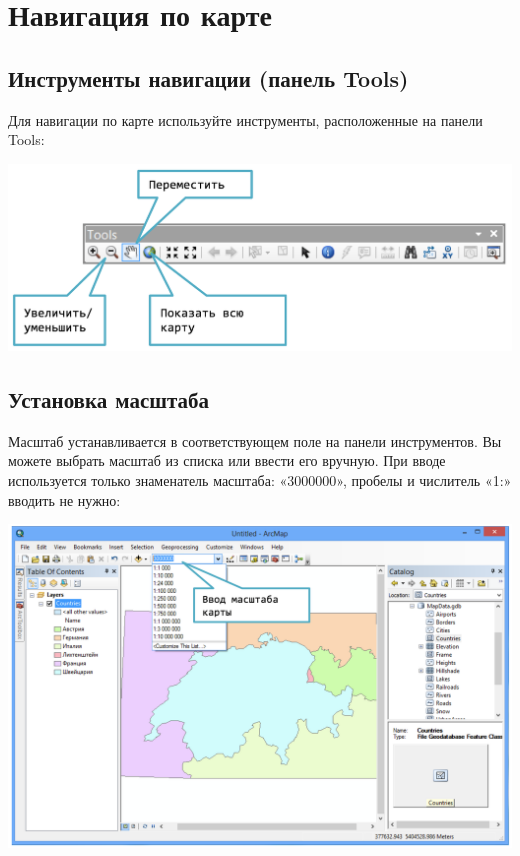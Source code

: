 \documentclass[]{book}
\theoremstyle{definition}
\theoremstyle{definition}
\theoremstyle{definition}
\theoremstyle{remark}
\begin{document}
\hypertarget{manual-navigation}{%
\chapter{Навигация по карте}\label{manual-navigation}}

\hypertarget{---tools}{%
\section{Инструменты навигации (панель Tools)}\label{---tools}}

Для навигации по карте используйте инструменты, расположенные на панели
Tools:

\includegraphics{images/Appendix/image4.png}

\hypertarget{-}{%
\section{Установка масштаба}\label{-}}

Масштаб устанавливается в соответствующем поле на панели инструментов.
Вы можете выбрать масштаб из списка или ввести его вручную. При вводе
используется только знаменатель масштаба: «3000000», пробелы и числитель
«1:» вводить не нужно:

\includegraphics{images/Appendix/image5.png}
\end{document}
